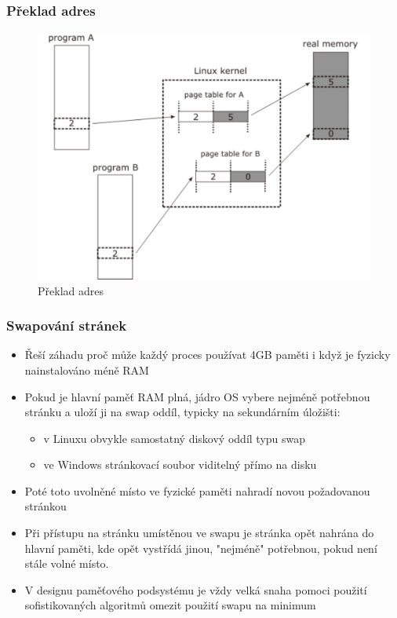 \documentclass[professionalfonts,svgnames]{beamer}
\begin{document}
\begin{frame}
\frametitle{Překlad adres}
\begin{figure}[h]
	\includegraphics[width=\textwidth,keepaspectratio]{fig/vm}
	\caption{Překlad adres}
	\label{vm}
\end{figure}
\end{frame}

 \begin{frame}
\frametitle{Swapování stránek}
\begin{itemize}
\item Řeší záhadu proč může každý proces používat 4GB paměti i když je fyzicky nainstalováno méně RAM
\item Pokud je hlavní paměť RAM plná, jádro OS vybere nejméně potřebnou stránku a uloží ji na swap oddíl, typicky na sekundárním úložišti:
	\begin{itemize}
		\item v Linuxu obvykle samostatný diskový oddíl typu swap
		\item ve Windows stránkovací soubor viditelný přímo na disku
	\end{itemize}
\item Poté toto uvolněné místo ve fyzické paměti nahradí novou požadovanou stránkou
\item Při přístupu na stránku umístěnou ve swapu je stránka opět nahrána do hlavní paměti, kde opět vystřídá jinou, "nejméně" potřebnou, pokud není stále volné místo.
\item V designu paměťového podsystému je vždy velká snaha pomoci použití sofistikovaných algoritmů omezit použití swapu na minimum
\end{itemize}
\end{frame}
\end{document}
